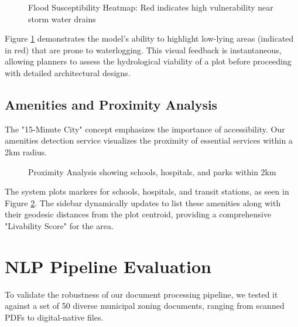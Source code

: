 \documentclass[12pt,a4paper]{report}
\begin{document}
\begin{figure}[H]
  \centering
  \caption{Flood Susceptibility Heatmap: Red indicates high vulnerability near storm water drains}
  \label{fig:flood-map}
\end{figure}

Figure \ref{fig:flood-map} demonstrates the model's ability to highlight low-lying areas (indicated in red) that are prone to waterlogging. This visual feedback is instantaneous, allowing planners to assess the hydrological viability of a plot before proceeding with detailed architectural designs.

\subsection{Amenities and Proximity Analysis}
The "15-Minute City" concept emphasizes the importance of accessibility. Our amenities detection service visualizes the proximity of essential services within a 2km radius.

\begin{figure}[H]
  \centering
  \caption{Proximity Analysis showing schools, hospitals, and parks within 2km}
  \label{fig:amenities}
\end{figure}

The system plots markers for schools, hospitals, and transit stations, as seen in Figure \ref{fig:amenities}. The sidebar dynamically updates to list these amenities along with their geodesic distances from the plot centroid, providing a comprehensive "Livability Score" for the area.

\section{NLP Pipeline Evaluation}
To validate the robustness of our document processing pipeline, we tested it against a set of 50 diverse municipal zoning documents, ranging from scanned PDFs to digital-native files.
\end{document}
